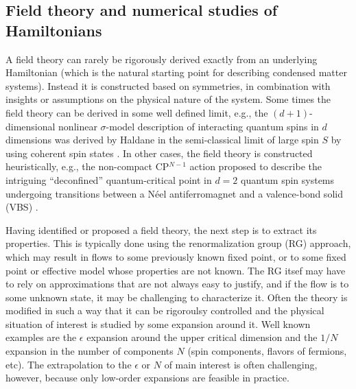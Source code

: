 \documentclass[range]{ar2e}
\begin{document}
\subsection{Field theory and numerical studies of Hamiltonians}

A field theory can rarely be rigorously derived exactly from 
an underlying Hamiltonian (which is the natural starting point for describing condensed matter systems). Instead
it is constructed based on symmetries, in combination with insights or assumptions on the physical nature of the
system. Some times the field theory can be derived in some well defined limit, e.g., the $(d+1)$-dimensional
nonlinear $\sigma$-model description of interacting quantum spins in $d$ dimensions was derived by Haldane in 
the semi-classical limit of large spin $S$ by using coherent spin states \cite{Haldane83,Chakravarty89,Auerbach94}. 
In other cases, the field theory is constructed heuristically, e.g., the non-compact CP$^{N-1}$ action
proposed to describe the intriguing ``deconfined'' quantum-critical point in $d=2$ quantum spin systems undergoing 
transitions between a N\'eel antiferromagnet and a valence-bond solid (VBS) \cite{Senthil04a,Sachdev08}.


Having identified or proposed a field
theory, the next step is to extract its properties. This is typically done using the renormalization group (RG)
approach, which may result in flows to some previously known fixed point, or to some fixed point or effective
model whose properties are not known. The RG itsef may have to rely on approximations that are not always easy
to justify, and if the flow is to some unknown state, it may be challenging to characterize it. Often the theory
is modified in such a way that it can be rigoroulsy controlled and the physical situation of interest is studied 
by some expansion around it. Well known examples are the $\epsilon$ expansion around the upper critical dimension 
and the $1/N$ expansion in the number of components $N$ (spin components, flavors of fermions, etc). The
extrapolation to the $\epsilon$ or $N$ of main interest is often challenging, however, because only low-order
expansions are feasible in practice.
\end{document}
